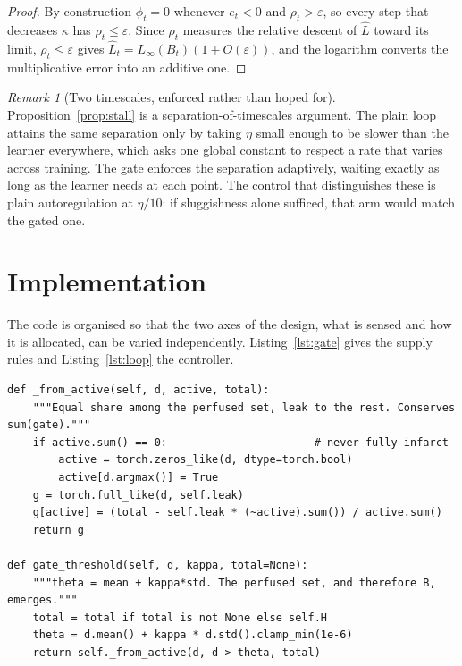 \documentclass[11pt]{report}
\theoremstyle{plain}
\theoremstyle{definition}
\theoremstyle{remark}
\newtheorem{remark}[proposition]{Remark}
\begin{document}
\begin{proof}
By construction $\phi_t = 0$ whenever $e_t < 0$ and $\rho_t > \varepsilon$, so every step
that decreases $\kappa$ has $\rho_t \le \varepsilon$. Since $\rho_t$ measures the relative
descent of $\widehat L$ toward its limit, $\rho_t \le \varepsilon$ gives
$\widehat L_t = L_\infty(B_t)(1 + O(\varepsilon))$, and the logarithm converts the
multiplicative error into an additive one.
\end{proof}

\begin{remark}[Two timescales, enforced rather than hoped for]
Proposition~\ref{prop:stall} is a separation-of-timescales argument. The plain loop attains
the same separation only by taking $\eta$ small enough to be slower than the learner
everywhere, which asks one global constant to respect a rate that varies across training.
The gate enforces the separation adaptively, waiting exactly as long as the learner needs
at each point. The control that distinguishes these is plain autoregulation at $\eta/10$:
if sluggishness alone sufficed, that arm would match the gated one.
\end{remark}

\section{Implementation}

The code is organised so that the two axes of the design, what is sensed and how it is
allocated, can be varied independently. Listing~\ref{lst:gate} gives the supply rules and
Listing~\ref{lst:loop} the controller.

\begin{lstlisting}[caption={Conserved allocation. Every rule routes through
\texttt{\_from\_active}, so conservation is structural rather than a property each rule
must remember.}, label={lst:gate}]
def _from_active(self, d, active, total):
    """Equal share among the perfused set, leak to the rest. Conserves sum(gate)."""
    if active.sum() == 0:                       # never fully infarct
        active = torch.zeros_like(d, dtype=torch.bool)
        active[d.argmax()] = True
    g = torch.full_like(d, self.leak)
    g[active] = (total - self.leak * (~active).sum()) / active.sum()
    return g

def gate_threshold(self, d, kappa, total=None):
    """theta = mean + kappa*std. The perfused set, and therefore B, emerges."""
    total = total if total is not None else self.H
    theta = d.mean() + kappa * d.std().clamp_min(1e-6)
    return self._from_active(d, d > theta, total)
\end{lstlisting}
\end{document}
